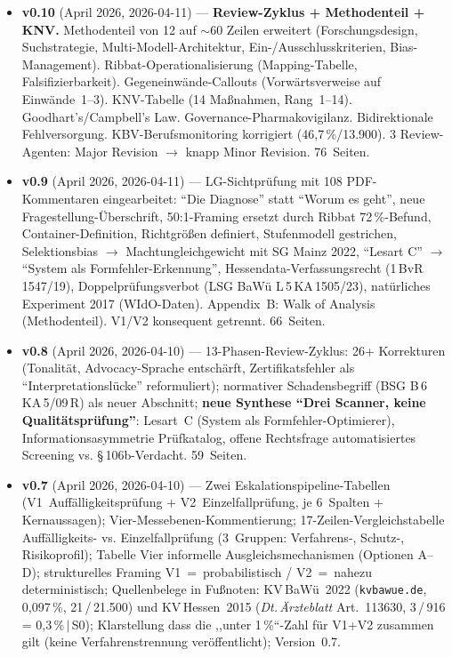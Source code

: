 \documentclass{umbruch-position}
\begin{document}
{\begin{itemize}[leftmargin=3em, itemsep=0.5em]
  \item \textbf{v0.10} (April 2026, 2026-04-11) --- \textbf{Review-Zyklus + Methodenteil + KNV.} Methodenteil von 12 auf $\sim$60 Zeilen erweitert (Forschungsdesign, Suchstrategie, Multi-Modell-Architektur, Ein-/Ausschlusskriterien, Bias-Management). Ribbat-Operationalisierung (Mapping-Tabelle, Falsifizierbarkeit). Gegeneinwände-Callouts (Vorwärtsverweise auf Einwände~1--3). KNV-Tabelle (14 Maßnahmen, Rang~1--14). Goodhart's/Campbell's Law. Governance-Pharmakovigilanz. Bidirektionale Fehlversorgung. KBV-Berufsmonitoring korrigiert (46,7\,\%/13.900). 3 Review-Agenten: Major Revision $\to$ knapp Minor Revision. 76~Seiten.

  \item \textbf{v0.9} (April 2026, 2026-04-11) --- LG-Sichtprüfung mit 108 PDF-Kommentaren eingearbeitet: ``Die Diagnose'' statt ``Worum es geht'', neue Fragestellung-Überschrift, 50:1-Framing ersetzt durch Ribbat 72\,\%-Befund, Container-Definition, Richtgrößen definiert, Stufenmodell gestrichen, Selektionsbias $\to$ Machtungleichgewicht mit SG Mainz 2022, ``Lesart C'' $\to$ ``System als Formfehler-Erkennung'', Hessendata-Verfassungsrecht (\mbox{1\,BvR\,1547/19}), Doppelprüfungsverbot (LSG BaWü L\,5\,KA\,1505/23), natürliches Experiment 2017 (WIdO-Daten). Appendix~B: Walk of Analysis (Methodenteil). V1/V2 konsequent getrennt. 66~Seiten.

  \item \textbf{v0.8} (April 2026, 2026-04-10) --- 13-Phasen-Review-Zyklus: 26+ Korrekturen (Tonalität, Advocacy-Sprache entschärft, Zertifikatsfehler als ``Interpretationslücke'' reformuliert); normativer Schadensbegriff (BSG B\,6\,KA\,5/09\,R) als neuer Abschnitt; \textbf{neue Synthese ``Drei Scanner, keine Qualitätsprüfung''}: Lesart~C (System als Formfehler-Optimierer), Informationsasymmetrie Prüfkatalog, offene Rechtsfrage automatisiertes Screening vs. \S\,106b-Verdacht. 59~Seiten.

  \item \textbf{v0.7} (April 2026, 2026-04-10) --- Zwei Eskalationspipeline-Tabellen (V1~Auffälligkeitsprüfung + V2~Einzelfallprüfung, je 6~Spalten + Kernaussagen); Vier-Messebenen-Kommentierung; 17-Zeilen-Vergleichstabelle Auffälligkeits- vs. Einzelfallprüfung (3~Gruppen: Verfahrens-, Schutz-, Risikoprofil); Tabelle Vier informelle Ausgleichs\-mechanismen (Optionen A--D); strukturelles Framing V1~=~probabilistisch / V2~=~nahezu deterministisch; Quellenbelege in Fußnoten: KV\,BaWü~2022 (\texttt{kvbawue.de}, 0,097\,\%, 21\,/\,21.500) und KV\,Hessen~2015 (\textit{Dt.\,Ärzteblatt} Art.~113630, 3\,/\,916 = 0,3\,\%\,$|$\,S0); Klarstellung dass die ,,unter 1\,\%``-Zahl für V1+V2 zusammen gilt (keine Verfahrenstrennung veröffentlicht); Version~0.7.


\end{itemize}}
\end{document}

